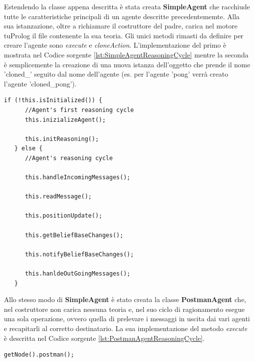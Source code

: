 \documentclass[12pt,a4paper,openright,twoside]{report}
\begin{document}
Estendendo la classe appena descritta \`e stata creata \textbf{SimpleAgent} che racchiude tutte le caratteristiche principali di un agente descritte precedentememte. Alla sua istanzazione, oltre a richiamare il costruttore del padre, carica nel motore tuProlog il file contenente la sua teoria. Gli unici metodi rimasti da definire per creare l'agente sono \textit{execute} e \textit{cloneAction}. L'implementazione del primo \`e mostrata nel Codice sorgente \ref{lst:SimpleAgentReasoningCycle} mentre la seconda \`e semplicemente la creazione di una nuova istanza dell'oggetto che prende il nome 'cloned\_' seguito dal nome dell'agente (es. per l'agente 'pong' verr\`a creato l'agente 'cloned\_pong').
\medskip
\begin{lstlisting}[firstnumber=1,label={lst:SimpleAgentReasoningCycle},caption={Simple Agent Reasoning Cycle}]
   if (!this.isInitialized()) {
      //Agent's first reasoning cycle
      this.inizializeAgent();

      this.initReasoning();
   } else {
      //Agent's reasoning cycle

      this.handleIncomingMessages();

      this.readMessage();

      this.positionUpdate();

      this.getBeliefBaseChanges();

      this.notifyBeliefBaseChanges();

      this.hanldeOutGoingMessages();
   }
\end{lstlisting}

Allo stesso modo di \textbf{SimpleAgent} \`e stato creata la classe \textbf{PostmanAgent} che, nel costruttore non carica nessuna teoria e, nel suo ciclo di ragionamento esegue una sola operazione, ovvero quella di prelevare i messaggi in uscita dai vari agenti e recapitarli al corretto destinatario. La sua implementazione del metodo \textit{execute} \`e descritta nel Codice sorgente \ref{lst:PostmanAgentReasoningCycle}.

\medskip
\begin{lstlisting}[firstnumber=1,label={lst:PostmanAgentReasoningCycle},caption={Postman Agent Reasoning Cycle}]
   getNode().postman();
\end{lstlisting}


\bigskip
\end{document}
